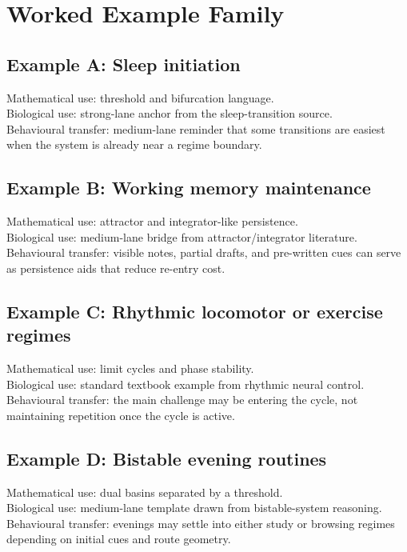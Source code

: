 \section{Worked Example Family}

\subsection*{Example A: Sleep initiation}

Mathematical use: threshold and bifurcation language.\\
Biological use: strong-lane anchor from the sleep-transition source.\\
Behavioural transfer: medium-lane reminder that some transitions are easiest
when the system is already near a regime boundary.

\subsection*{Example B: Working memory maintenance}

Mathematical use: attractor and integrator-like persistence.\\
Biological use: medium-lane bridge from attractor/integrator literature.\\
Behavioural transfer: visible notes, partial drafts, and pre-written cues can
serve as persistence aids that reduce re-entry cost.

\subsection*{Example C: Rhythmic locomotor or exercise regimes}

Mathematical use: limit cycles and phase stability.\\
Biological use: standard textbook example from rhythmic neural control.\\
Behavioural transfer: the main challenge may be entering the cycle, not
maintaining repetition once the cycle is active.

\subsection*{Example D: Bistable evening routines}

Mathematical use: dual basins separated by a threshold.\\
Biological use: medium-lane template drawn from bistable-system reasoning.\\
Behavioural transfer: evenings may settle into either study or browsing
regimes depending on initial cues and route geometry.

